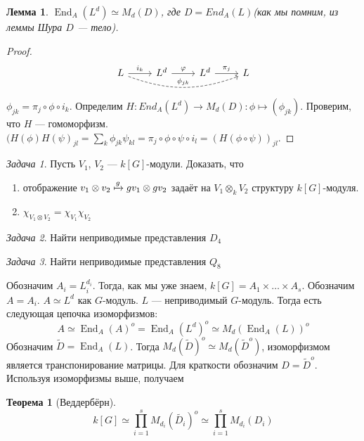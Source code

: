 \documentclass{article}
\newtheorem*{theorem}{Теорема}
\newtheorem*{lemma}{Лемма}
\theoremstyle{definition}
\theoremstyle{remark}
\newtheorem{prb}{Задача}
\newenvironment{problem}
{\begin{prb}
\label{\theprb}}
{\end{prb}}
\DeclareMathOperator{\End}{End}
\begin{document}
\begin{lemma}
$\End_A(L^d) \simeq M_d(D)$, где $D = End_A(L)$(как мы помним, из леммы Шура $D$ --- тело).
\end{lemma}
\begin{proof}
\begin{equation*}
\begin{tikzcd}
	L \rar{i_k} \ar[bend right = 20, dashed]{rrr}{\phi_{jk}} & L^d \rar{\varphi} & L^d \rar{\pi_j} & L 
\end{tikzcd}
\end{equation*}
$\phi_{jk} = \pi_j \circ \phi \circ i_k$.
	Определим $H: End_A(L^d) \rightarrow M_d(D): \phi \mapsto (\phi_{jk}).$
	Проверим, что $H$ ---  гомоморфизм. $(H(\phi) H(\psi)_{jl} = \sum\limits_k \phi_{jk} \psi_{kl} = \pi_j \circ \phi \circ \psi \circ i_l = (H(\phi \circ \psi))_{jl}$.
\end{proof}

\begin{problem}
Пусть $V_1$, $V_2$ --- $k[G]$-модули. Доказать, что
\begin{enumerate}

	\item отображение $v_1 \otimes v_2 \xmapsto{g} gv_1 \otimes gv_2$ задаёт на $V_1 \otimes_k V_2$ структуру $k[G]$-модуля.
	\item $\chi_{V_1 \otimes V_2} = \chi_{V_1} \chi_{V_2}$
\end{enumerate}
\end{problem}
\begin{problem}
	Найти неприводимые представления $D_4$
\end{problem}
\begin{problem}
	Найти неприводимые представления $Q_8$
\end{problem}

Обозначим $A_i = L_i^{d_i}$. Тогда, как мы уже знаем, $k[G] = A_1 \times \hdots \times A_s$. Обозначим $A = A_i$. $A \simeq L^d$ как $G$-модуль. $L$ --- неприводимый $G$-модуль. Тогда есть следующая цепочка изоморфизмов:
\begin{equation*}
    A \simeq \End_A(A)^o = \End_A(L^d)^o \simeq M_d(\End_A(L))^o
\end{equation*}
Обозначим $\tilde{D} = \End_A(L)$. Тогда $M_d(\tilde{D})^o \simeq M_d(\tilde{D}^o)$, изоморфизмом является транспонирование матрицы. Для краткости обозначим $D = \tilde{D}^o$. Используя изоморфизмы выше, получаем

\begin{theorem}[Веддербёрн]
\begin{equation*}
    k[G] \simeq \underset{i=1}{\overset{s}{\prod}} M_{d_i}(\tilde{D_i})^o \simeq \underset{i=1}{\overset{s}{\prod}} M_{d_i}(D_i)
\end{equation*}
\end{theorem}
\end{document}
